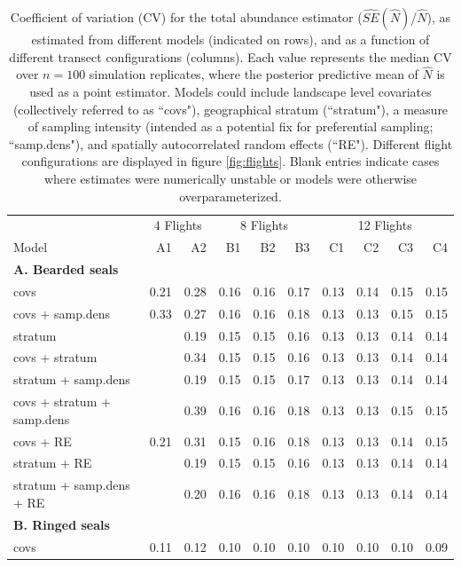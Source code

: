 \documentclass[]{rsos}%
\begin{document}
\begin{table}[ht]
\caption{Coefficient of variation (CV) for the total abundance estimator ($\hat{SE}(\hat{N})$/$\hat{N}$), as estimated from different models (indicated on rows), and as a function of different transect configurations (columns).  Each value represents the median CV over $n=100$ simulation replicates, where the posterior predictive mean of $\hat{N}$ is used as a point estimator.  Models could include landscape level covariates (collectively referred to as ``covs"), geographical stratum (``stratum"), a measure of sampling intensity (intended as a potential fix for preferential sampling; ``samp.dens"), and spatially autocorrelated random effects (``RE").  Different flight configurations are displayed in figure \ref{fig:flights}.  Blank entries indicate cases where estimates were numerically unstable or models were otherwise overparameterized.
}
\label{tab:CV}
\centering
\begin{tabular}{lrrrrrrrrr}
  \hline
   & \multicolumn{2}{c}{4 Flights} & \multicolumn{3}{c}{8 Flights} & \multicolumn{4}{c}{12 Flights} \\
   \cmidrule(lr){2-3} \cmidrule(lr){4-6} \cmidrule(lr){7-10}
Model & A1 & A2 & B1 & B2 & B3 & C1 & C2 & C3 & C4 \\
  \hline
  {\bf A. Bearded seals} & & & & & & & & & \\
covs & 0.21 & 0.28 & 0.16 & 0.16 & 0.17 & 0.13 & 0.14 & 0.15 & 0.15 \\
  covs + samp.dens & 0.33 & 0.27 & 0.16 & 0.16 & 0.18 & 0.13 & 0.13 & 0.15 & 0.15 \\
  stratum &  & 0.19 & 0.15 & 0.15 & 0.16 & 0.13 & 0.13 & 0.14 & 0.14 \\
  covs + stratum &  & 0.34 & 0.15 & 0.15 & 0.16 & 0.13 & 0.13 & 0.14 & 0.14 \\
  stratum + samp.dens &  & 0.19 & 0.15 & 0.15 & 0.17 & 0.13 & 0.13 & 0.14 & 0.14 \\
  covs + stratum + samp.dens &  & 0.39 & 0.16 & 0.16 & 0.18 & 0.13 & 0.13 & 0.15 & 0.15 \\
  covs + RE & 0.21 & 0.31 & 0.15 & 0.16 & 0.18 & 0.13 & 0.13 & 0.14 & 0.15 \\
  stratum + RE &  & 0.19 & 0.15 & 0.15 & 0.16 & 0.13 & 0.13 & 0.14 & 0.14 \\
  stratum + samp.dens + RE &  & 0.20 & 0.16 & 0.16 & 0.18 & 0.13 & 0.13 & 0.14 & 0.14 \\  {\bf B. Ringed seals} & & & & & & & & & \\
  covs & 0.11 & 0.12 & 0.10 & 0.10 & 0.10 & 0.10 & 0.10 & 0.10 & 0.09 \\

\end{tabular}
\end{table}
\end{document}
